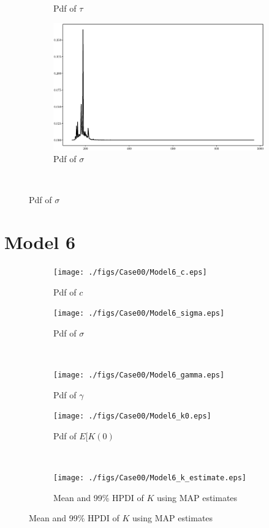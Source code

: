 \documentclass[]{elsarticle}
\begin{document}
\begin{figure}[!htb]
\begin{subfigure}{.49\textwidth}
\caption{Pdf of $\tau$}
\label{fig:s1c}
\end{subfigure}
\begin{subfigure}{.49\textwidth}
\centering
\includegraphics[width=\linewidth,keepaspectratio]{./figs/Case00/Model5_sigma.eps}
\caption{Pdf of $\sigma$}
\label{fig:s1c}
\end{subfigure}\\
\end{figure}

\section*{Model 6}

\begin{figure}[!htb]
\centering
\begin{subfigure}{.49\textwidth}
\texttt{[image: ./figs/Case00/Model6\_c.eps]}
\caption{Pdf of $c$}
\end{subfigure}
\begin{subfigure}{.49\textwidth}
\centering
\texttt{[image: ./figs/Case00/Model6\_sigma.eps]}
\caption{Pdf of $\sigma$}
\label{fig:s1c}
\end{subfigure}\\
\begin{subfigure}{.49\textwidth}
\centering
\texttt{[image: ./figs/Case00/Model6\_gamma.eps]}
\caption{Pdf of $\gamma$}
\label{fig:s1c}
\end{subfigure}
\begin{subfigure}{.49\textwidth}
\centering
\texttt{[image: ./figs/Case00/Model6\_k0.eps]}
\caption{Pdf of $E[K(0)$}
\label{fig:s1c}
\end{subfigure}\\
\begin{subfigure}{.99\textwidth}
\centering
\texttt{[image: ./figs/Case00/Model6\_k\_estimate.eps]}
\caption{Mean and 99\% HPDI of $K$ using MAP estimates}
\label{fig:s1d}
\end{subfigure}
\end{figure}
\end{document}
